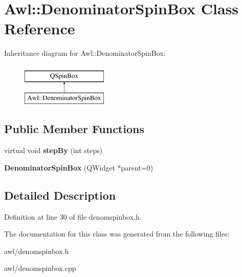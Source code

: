 \hypertarget{class_awl_1_1_denominator_spin_box}{}\section{Awl\+:\+:Denominator\+Spin\+Box Class Reference}
\label{class_awl_1_1_denominator_spin_box}
Inheritance diagram for Awl\+:\+:Denominator\+Spin\+Box\+:\begin{figure}[H]
\begin{center}
\leavevmode
\includegraphics[height=2.000000cm]{class_awl_1_1_denominator_spin_box}
\end{center}
\end{figure}
\subsection*{Public Member Functions}
\begin{DoxyCompactItemize}
\item 
\mbox{\label{class_awl_1_1_denominator_spin_box_ab9fc4708d756aa491733a94b86940d69}} 
virtual void {\bfseries step\+By} (int steps)
\item 
\mbox{\label{class_awl_1_1_denominator_spin_box_a731bf7b1d0c31ffa8732e13ec2d03d75}} 
{\bfseries Denominator\+Spin\+Box} (Q\+Widget $\ast$parent=0)
\end{DoxyCompactItemize}


\subsection{Detailed Description}


Definition at line 30 of file denomspinbox.\+h.



The documentation for this class was generated from the following files\+:\begin{DoxyCompactItemize}
\item 
awl/denomspinbox.\+h\item 
awl/denomspinbox.\+cpp\end{DoxyCompactItemize}
